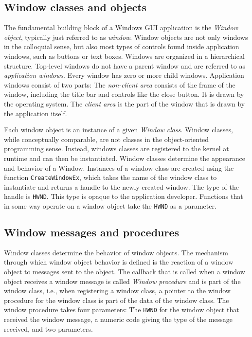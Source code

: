 \documentclass[10pt,twocolumn,a4paper]{article}
\begin{document}
		\subsection{Window classes and objects}
			The fundamental building block of a Windows GUI application is the
			\textit{Window object}, typically just referred to as \textit{window}.
			Window objects are not only windows in the colloquial sense, but also
			most types of controls found inside application windows, such as buttons
			or text boxes. Windows are organized in a hierarchical structure.
			Top-level windows do not have a parent window and are referred to as
			\textit{application windows}. Every window has zero or more child
			windows. Application windows consist of two parts: The \textit{non-client
			area} consists of the frame of the window, including the title bar and
			controls like the close button. It is drawn by the operating system.
			The \textit{client area} is the part of the window that is drawn by
			the application itself.
			\cite{whatiswindow}

			Each window object is an instance of a given \textit{Window class}.
			Window classes, while conceptually comparable, are not classes in
			the object-oriented programming sense. Instead, windows classes are
			registered to the kernel at runtime and can then be instantiated.
			Window classes determine the appearance and behavior of a Window.
			Instances of a window class are created using the function
			\texttt{CreateWindowEx}, which takes the name of the window class
			to instantiate and returns a handle to the newly created window.
			The type of the handle is \texttt{HWND}. This type is opaque to the
			application developer. Functions that in some way operate on a
			window object take the \texttt{HWND} as a parameter.
			\cite{creatingwindow,whatiswindow}

		\subsection{Window messages and procedures}
			Window classes determine the behavior of window objects. The mechanism
			through which window object behavior is defined is the reaction of
			a window object to messages sent to the object. The callback that
			is called when a window object receives a window message is called
			\textit{Window procedure} and is part of the window class, i.e., when
			registering a window class, a pointer to the window procedure for the
			window class is part of the data of the window class. The window
			procedure takes four parameters: The \texttt{HWND} for the window
			object that received the window message, a numeric code giving the
			type of the message received, and two parameters.
\end{document}
